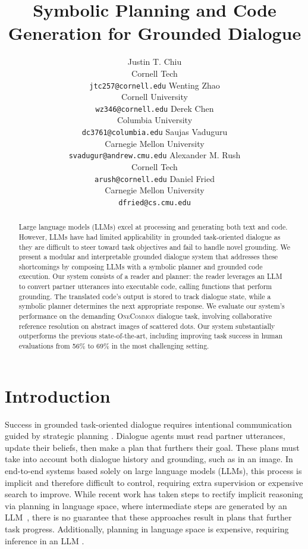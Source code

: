 \documentclass[11pt]{article}
\title{
Symbolic Planning and Code Generation
for Grounded Dialogue
}
\author{
Justin T. Chiu  \\
Cornell Tech \\
\texttt{jtc257@cornell.edu}
\And
Wenting Zhao \\
Cornell University \\
\texttt{wz346@cornell.edu}
\And
Derek Chen \\
Columbia University \\
\texttt{dc3761@columbia.edu}
\AND
Saujas Vaduguru \\
Carnegie Mellon University \\
\texttt{svadugur@andrew.cmu.edu}
\And
Alexander M. Rush \\
Cornell Tech \\
\texttt{arush@cornell.edu}
\And
Daniel Fried \\
Carnegie Mellon University \\
\texttt{dfried@cs.cmu.edu}
}
\begin{document}
\maketitle
\begin{abstract}
Large language models (LLMs) excel at processing and generating both text and code. However, LLMs have had limited applicability in grounded task-oriented dialogue as they are difficult to steer toward task objectives and fail to handle novel grounding. We present a modular and interpretable grounded dialogue system that addresses these shortcomings by composing LLMs with a symbolic planner and grounded code execution. Our system consists of a reader and planner: the reader leverages an LLM to convert partner utterances into executable code, calling functions that perform grounding. The translated code's output is stored to track dialogue state, while a symbolic planner determines the next appropriate response. We evaluate our system's performance on the demanding \textsc{OneCommon} dialogue task, involving collaborative reference resolution on abstract images of scattered dots. Our system substantially outperforms the previous state-of-the-art, including improving task success in human evaluations from 56\% to 69\% in the most challenging setting.
\end{abstract}

\section{Introduction}
Success in grounded task-oriented dialogue requires intentional communication guided by strategic planning \citep[\emph{inter alia}]{cohen1979-speech-acts,traum1994computational,Walker2004-generation,Rieser2009-planning,cicero}. 
Dialogue agents must read partner utterances, update their beliefs, then make a plan that furthers their goal.
These plans must take into account both dialogue history and grounding, such as in an image.
In end-to-end systems based solely on large language models (LLMs),
this process is implicit and therefore difficult to control,
requiring extra supervision \citep{rlhf} or expensive search \citep{astaresque} to improve.
While recent work has taken steps to rectify implicit reasoning via
planning in language space, 
where intermediate steps are generated by an LLM~\citep{cot},
there is no guarantee that these approaches result in plans that further task progress.
Additionally, planning in language space is expensive,
requiring inference in an LLM \citep{yarats2017rollout,bamcp}.
\end{document}

